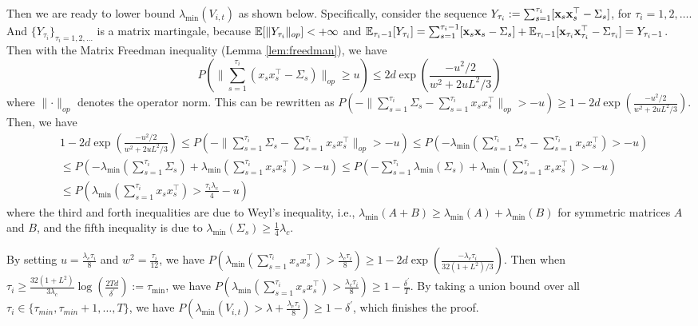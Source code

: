 Then we are ready to lower bound $\lambda_{\min}(V_{i,t})$ as shown below. Specifically, consider the sequence $Y_{\tau_{i}}:= \sum_{s=1}^{\tau_{i}}[\mathbf{x}_{s} \mathbf{x}_{s}^{\top} - \Sigma_{s}]$, for $\tau_{i}=1,2,\dots$. And $\{Y_{\tau_{i}}\}_{\tau_{i}=1,2,\dots}$ is a matrix martingale, because $\mathbb{E}[\lVert Y_{\tau_{i}} \rVert_{op}] < +\infty$ and $\mathbb{E}_{\tau_{i}-1}[Y_{\tau_{i}}]=\sum_{s=1}^{\tau_{i}-1}[\mathbf{x}_{s}\mathbf{x}_{s}-\Sigma_{s}]+\mathbb{E}_{\tau_{i}-1}[\mathbf{x}_{\tau_{i}}\mathbf{x}_{\tau_{i}}^{\top}-\Sigma_{\tau_{i}}]=Y_{\tau_{i}-1}$. Then with the Matrix Freedman inequality (Lemma \ref{lem:freedman}), we have
\begin{equation}
    P( \lVert \sum_{s=1}^{\tau_{i}} (x_{s} x_{s}^{\top} - \Sigma_{s}) \rVert_{op} \geq u) \leq 2d \exp(\frac{-u^{2}/2}{w^{2}+2 u L^{2}/3})
\end{equation}
where $\lVert \cdot \rVert_{op}$ denotes the operator norm. This can be rewritten as $P(- \lVert \sum_{s=1}^{\tau_{i}}\Sigma_{s} - \sum_{s=1}^{\tau_{i}} x_{s} x_{s}^{\top} \rVert_{op} > -u) \geq 1-2d \exp(\frac{-u^{2}/2}{w^{2}+2 u L^{2}/3})$. Then, we have
\begin{align*}
    & 1-2d \exp(\frac{-u^{2}/2}{w^{2}+2 u L^{2}/3}) \leq P(-\lVert \sum_{s=1}^{\tau_{i}}\Sigma_{s} - \sum_{s=1}^{\tau_{i}} x_{s} x_{s}^{\top} \rVert_{op} > -u) \leq P(-\lambda_{\min}(\sum_{s=1}^{\tau_{i}}\Sigma_{s} - \sum_{s=1}^{\tau_{i}} x_{s} x_{s}^{\top} ) > -u) \\
    & \leq P(-\lambda_{\min}(\sum_{s=1}^{\tau_{i}}\Sigma_{s}) + \lambda_{\min}( \sum_{s=1}^{\tau_{i}} x_{s} x_{s}^{\top} ) > -u) \leq P(-\sum_{s=1}^{\tau_{i}}\lambda_{\min}(\Sigma_{s}) + \lambda_{\min}( \sum_{s=1}^{\tau_{i}} x_{s} x_{s}^{\top} ) > -u) \\
    & \leq P(\lambda_{\min}( \sum_{s=1}^{\tau_{i}} x_{s} x_{s}^{\top} ) > \frac{\tau_{i}\lambda_{c}}{4} -u)
\end{align*}
where the third and forth inequalities are due to Weyl's inequality, i.e., $\lambda_{\min}(A+B) \geq \lambda_{\min}(A)+\lambda_{\min}(B)$ for symmetric matrices $A$ and $B$, and the fifth inequality is due to $\lambda_{\min}(\Sigma_{s}) \geq \frac{1}{4}\lambda_{c}$.

By setting $u=\frac{\lambda_{c}\tau_{i}}{8}$ and $w^{2}=\frac{\tau_{i}}{12}$, we have $P(\lambda_{\min}( \sum_{s=1}^{\tau_{i}} x_{s} x_{s}^{\top} ) > \frac{\lambda_{c}\tau_{i}}{8}) \geq 1-2d\exp(\frac{-\lambda_{c}\tau_{i}}{32(1+L^{2})/3})$. Then when $\tau_{i} \geq \frac{32(1+L^{2})}{3 \lambda_{c}}\log(\frac{2Td}{\delta^{\prime}}):=\tau_{\min}$, we have $P(\lambda_{\min}( \sum_{s=1}^{\tau_{i}} x_{s} x_{s}^{\top} ) > \frac{\lambda_{c}\tau_{i}}{8}) \geq 1-\frac{\delta^{\prime}}{T}$. By taking a union bound over all 
$\tau_{i} \in\{\tau_{min},\tau_{min}+1,\dots,T\}$, we have $P(\lambda_{\min}( V_{i,t} ) > \lambda + \frac{\lambda_{c}\tau_{i}}{8}) \geq 1-\delta^{\prime}$, which finishes the proof.

